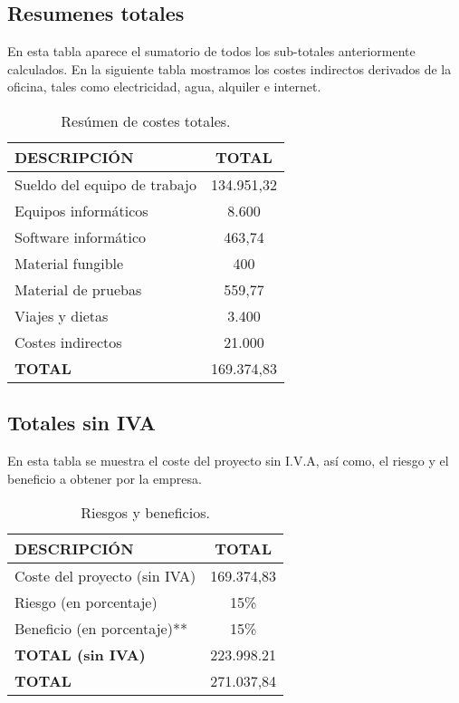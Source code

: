 \documentclass[10pt,a4paper,oldfontcommands]{plantillaDPDS}
\begin{document}
\subsection{Resumenes totales}
En esta tabla aparece el sumatorio de todos los sub-totales anteriormente calculados.
En la siguiente tabla mostramos los costes indirectos derivados de la oficina, tales como electricidad, agua, alquiler e internet.
\begin{table}[H]
\begin{center}
\begin{tabular}{l c}
\textbf{DESCRIPCIÓN} & \textbf{TOTAL}\\ \hline \hline
Sueldo del equipo de trabajo & 134.951,32\\
Equipos informáticos & 8.600\\
Software informático & 463,74\\
Material fungible & 400\\
Material de pruebas & 559,77\\
Viajes y dietas & 3.400\\
Costes indirectos & 21.000\\ \hline \hline
\textbf{TOTAL} & 169.374,83\\ \hline
\end{tabular}
\caption{Resúmen de costes totales.}
\label{tab:resumenTotal}
\end{center}
\end{table}



\subsection{Totales sin IVA}
En esta tabla se muestra el coste del proyecto sin I.V.A, así como, el riesgo y el beneficio a obtener por la empresa.
\begin{table}[H]
\begin{center}
\begin{tabular}{l c}
\textbf{DESCRIPCIÓN} & \textbf{TOTAL}\\ \hline \hline
Coste del proyecto (sin IVA) & 169.374,83\\
Riesgo (en porcentaje) & 15\% \\
Beneficio (en porcentaje)** & 15\% \\ \hline \hline
\textbf{TOTAL (sin IVA)} & 223.998.21\\ \hline \hline
\textbf{TOTAL} & 271.037,84\\ \hline
\end{tabular}
\caption{Riesgos y beneficios.}
\label{tab:total}
\end{center}
\end{table}
\end{document}
